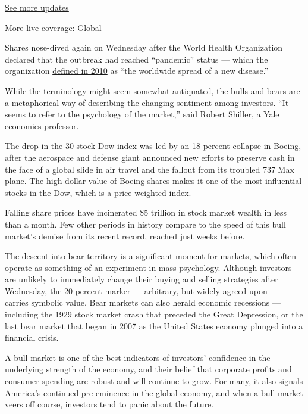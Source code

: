 \href{https://www.nytimes3xbfgragh.onion/live/2020/08/03/business/stock-market-today-coronavirus?action=click\&pgtype=Article\&state=default\&region=MAIN_CONTENT_1\&context=storylines_live_updates}{See
more updates}

More live coverage:
\href{https://www.nytimes3xbfgragh.onion/2020/08/03/world/coronavirus-covid-19.html?action=click\&pgtype=Article\&state=default\&region=MAIN_CONTENT_1\&context=storylines_live_updates}{Global}

Shares nose-dived again on Wednesday after the World Health Organization
declared that the outbreak had reached ``pandemic'' status --- which the
organization
\href{https://www.who.int/csr/disease/swineflu/frequently_asked_questions/pandemic/en/}{defined
in 2010} as ``the worldwide spread of a new disease.''

While the terminology might seem somewhat antiquated, the bulls and
bears are a metaphorical way of describing the changing sentiment among
investors. ``It seems to refer to the psychology of the market,'' said
Robert Shiller, a Yale economics professor.

The drop in the 30-stock
\href{https://www.nytimes3xbfgragh.onion/2020/04/08/business/media/dow-jones-wall-street-journal-william-lewis.html}{Dow}
index was led by an 18 percent collapse in Boeing, after the aerospace
and defense giant announced new efforts to preserve cash in the face of
a global slide in air travel and the fallout from its troubled 737 Max
plane. The high dollar value of Boeing shares makes it one of the most
influential stocks in the Dow, which is a price-weighted index.

Falling share prices have incinerated \$5 trillion in stock market
wealth in less than a month. Few other periods in history compare to the
speed of this bull market's demise from its recent record, reached just
weeks before.

The descent into bear territory is a significant moment for markets,
which often operate as something of an experiment in mass psychology.
Although investors are unlikely to immediately change their buying and
selling strategies after Wednesday, the 20 percent marker --- arbitrary,
but widely agreed upon --- carries symbolic value. Bear markets can also
herald economic recessions --- including the 1929 stock market crash
that preceded the Great Depression, or the last bear market that began
in 2007 as the United States economy plunged into a financial crisis.

A bull market is one of the best indicators of investors' confidence in
the underlying strength of the economy, and their belief that corporate
profits and consumer spending are robust and will continue to grow. For
many, it also signals America's continued pre-eminence in the global
economy, and when a bull market veers off course, investors tend to
panic about the future.

